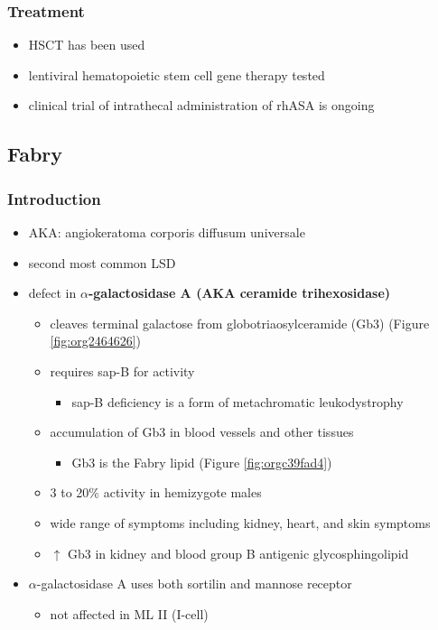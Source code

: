 \documentclass[12pt]{scrartcl}
\begin{document}
\subsubsection{Treatment}
\label{sec:org8d5c913}
\begin{itemize}
\item HSCT has been used
\item lentiviral hematopoietic stem cell gene therapy tested
\item clinical trial of intrathecal administration of rhASA is ongoing
\end{itemize}
\subsection{Fabry}
\label{sec:orgfee156d}
\subsubsection{Introduction}
\label{sec:org8a06bf6}
\begin{itemize}
\item AKA: angiokeratoma corporis diffusum universale
\item second most common LSD
\item defect in \textbf{\(\alpha\)-galactosidase A (AKA ceramide trihexosidase)}
\begin{itemize}
\item cleaves terminal galactose from globotriaosylceramide (Gb3)
(Figure \ref{fig:org2464626})
\item requires sap-B for activity
\begin{itemize}
\item sap-B deficiency is a form of metachromatic leukodystrophy
\end{itemize}
\item accumulation of Gb3 in blood vessels and other tissues
\begin{itemize}
\item Gb3 is the Fabry lipid (Figure \ref{fig:orgc39fad4})
\end{itemize}
\item 3 to 20\% activity in hemizygote males
\item wide range of symptoms including kidney, heart, and skin symptoms
\item \(\uparrow\) Gb3 in kidney and blood group B antigenic glycosphingolipid
\end{itemize}
\item \(\alpha\)-galactosidase A uses both sortilin and mannose receptor
\begin{itemize}
\item not affected in ML II (I-cell)
\end{itemize}
\end{itemize}
\end{document}
